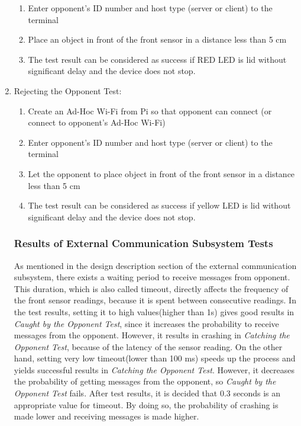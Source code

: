 \documentclass[a4paper,12pt]{article}
\begin{document}
\begin{enumerate}
\begin{enumerate}
		\item Enter opponent's ID number and host type (server or client) to the terminal
		
		\item Place an object in front of the front sensor in a distance less than 5 cm
		
		\item The test result can be considered as success if RED LED is lid without significant delay and the device does not stop.
		
	\end{enumerate}	
	
	\item Rejecting the Opponent Test:
	
	
	\begin{enumerate}
		
		\item Create an Ad-Hoc Wi-Fi from Pi so that opponent can connect (or connect to opponent's Ad-Hoc Wi-Fi)
		
		\item Enter opponent's ID number and host type (server or client) to the terminal
		
		\item Let the opponent to place object  in front of the front sensor in a distance less than 5 cm
		
		\item The test result can be considered as success if yellow LED is lid without significant delay and the device does not stop.
		
	\end{enumerate}	
	
	
	
	\subsubsection*{Results of External Communication Subsystem Tests}
	
	As mentioned in the design description section of the external communication subsystem, there exists a waiting period to receive messages from opponent. This duration, which is also called timeout, directly affects the frequency of the front sensor readings, because it is spent between consecutive readings. In the test results, setting it to high values(higher than 1s) gives good results in  \textit{Caught by the Opponent Test}, since it increases the probability to receive messages from the opponent. However, it results in crashing in \textit{Catching the Opponent Test}, because of the latency of the sensor reading. On the other hand, setting very low timeout(lower than 100 ms) speeds up the process and yields successful results in \textit{Catching the Opponent Test}. However, it decreases the probability of getting messages from the opponent, so \textit{Caught by the Opponent Test} fails. After test results, it is decided that 0.3 seconds is an appropriate value for timeout. By doing so, the probability of crashing is made lower and receiving messages is made higher.
	
\end{enumerate}
\end{document}
